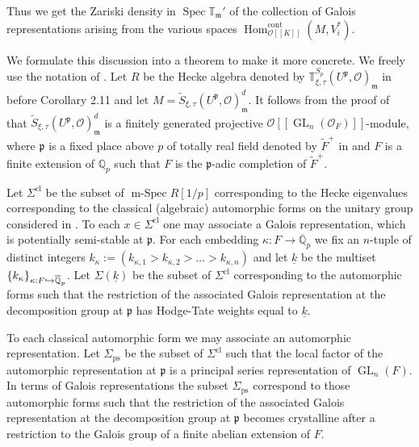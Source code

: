 \documentclass[JEP,XML,SOM,Unicode,NoEqCountersInSection]{cedram}
\let\mathcal\mathscr
\newcommand\hto{\mathrel{\lhook\joinrel\to}}
\newcommand{\rps}{\mathrm{ps}}
\theoremstyle{definition}
\DeclareMathOperator{\Hom}{Hom}
\DeclareMathOperator{\GL}{GL}
\DeclareMathOperator{\Spec}{Spec}
\DeclareMathOperator{\mSpec}{m-Spec}
\newcommand{\br}[1]{[\![#1]\!]}
\newcommand{\Qp}{\mathbb {Q}_p}
\newcommand{\Qpbar}{\overline{\mathbb{Q}}_p}
\newcommand{\mm}{\mathfrak m}
\newcommand{\cO}{\mathcal{O}}
\newcommand{\TT}{\mathbb T}
\newcommand{\pp}{\mathfrak p}
\newcommand{\cont}{\mathrm{cont}}
\begin{document}
Thus we get the Zariski density in $\Spec \mathbb T_{\mathfrak m}'$
of the collection of Galois representations arising from the various spaces
$\Hom_{\mathcal O\br{K}}^{\cont}(M,V_i^*).$

We formulate this discussion into a theorem to make it more concrete. We freely use the notation of \cite{six-authors}.
Let $R$ be the Hecke algebra denoted by
$\TT^{S_p}_{\xi, \tau}(U^{\pp}, \cO)_{\mm}$ in \cite{six-authors} before Corollary 2.11 and let $M= \tilde{S}_{\xi, \tau}(U^\pp, \cO)^d_\mm$.
It follows from the proof of \cite[Prop.\,2.10]{six-authors} that $\tilde{S}_{\xi, \tau}(U^\pp, \cO)^d_\mm$ is a finitely generated projective
$\cO\br{\GL_n(\cO_F)}$-module, where $\pp$ is a fixed place above $p$ of totally real field denoted by $\widetilde{F}^+$ in \cite{six-authors} and
$F$ is a finite extension of $\Qp$ such that $F$ is the $\pp$-adic completion of $\widetilde{F}^+$.

Let $\Sigma^{\mathrm{cl}}$ be the subset of $\mSpec R[1/p]$ corresponding to the Hecke eigenvalues corresponding
to the classical (algebraic) automorphic forms on the unitary group considered in \cite[\S 2.3]{six-authors}. To each $x\in \Sigma^{\mathrm{cl}}$
one may associate a Galois representation, which is potentially semi-stable at $\pp$. For each embedding $\kappa: F\to \Qpbar$ we fix
an $n$-tuple of distinct integers $k_{\kappa}:=(k_{\kappa, 1}> k_{\kappa, 2} > \ldots > k_{\kappa, n})$ and let $\underline{k}$ be the multiset
$\{k_\kappa\}_{\kappa: F \hto \Qpbar}$. Let $\Sigma(\underline{k})$ be the subset of $\Sigma^{\mathrm{cl}}$
corresponding to the automorphic forms such that the restriction of the associated Galois representation at the decomposition group at $\pp$
has Hodge-Tate weights equal to $\underline{k}$.

To each classical automorphic form we may associate an automorphic representation. Let $\Sigma_{\rps}$ be the subset of $\Sigma^{\mathrm{cl}}$ such that
the local factor of the automorphic representation at $\pp$ is a principal series representation of $\GL_n(F)$. In terms of Galois representations
the subset $\Sigma_{\rps}$ correspond to those automorphic forms such that the restriction of the associated Galois representation at the decomposition group at $\pp$ becomes crystalline after a restriction to the Galois group of a finite abelian extension of $F$.
\end{document}
